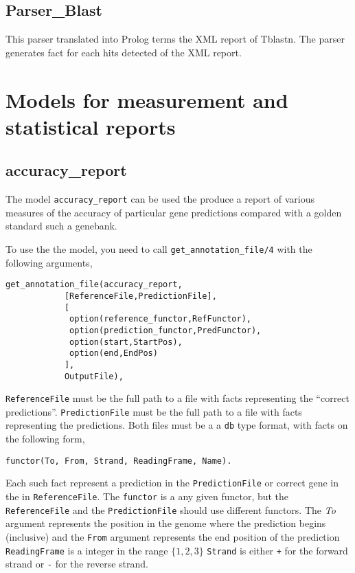 \documentclass{book}
\begin{document}
\subsection{Parser\_Blast}

This parser translated into Prolog terms the XML report of Tblastn. The parser generates fact for
each hits detected of the XML report. 


\section{Models for measurement and statistical reports}

\subsection{accuracy\_report}

The model \texttt{accuracy\_report} can be used the produce a report of
various measures of the accuracy of particular gene predictions
compared with a golden standard such a genebank. 

To use the the model, you need to call
\texttt{get\_annotation\_file/4} with the following arguments,
\begin{verbatim}
get_annotation_file(accuracy_report,
		    [ReferenceFile,PredictionFile],
		    [
		     option(reference_functor,RefFunctor),
		     option(prediction_functor,PredFunctor),
		     option(start,StartPos),
		     option(end,EndPos)
		    ],
		    OutputFile),
\end{verbatim}

\texttt{ReferenceFile} must be the full path to a file with facts
representing the ``correct predictions''.  
\texttt{PredictionFile} must be the full path to a file with facts
representing the predictions. Both files must be a a \texttt{db} type 
format, with facts on the following form,
\begin{verbatim}
functor(To, From, Strand, ReadingFrame, Name).
\end{verbatim}

Each such fact represent a prediction in the \texttt{PredictionFile} or
correct gene in the in \texttt{ReferenceFile}. 
The \texttt{functor} is a any given functor, but the
\texttt{ReferenceFile} and the \texttt{PredictionFile} should use
different functors. The \emph{To} argument represents the position in
the genome where the prediction begins (inclusive) and the
\texttt{From} argument represents the end position of the prediction
\texttt{ReadingFrame} is a integer in the range $\{1,2,3\}$
\texttt{Strand} is either \texttt{+} for the forward strand or
    \texttt{-} for the reverse strand. 
\end{document}
